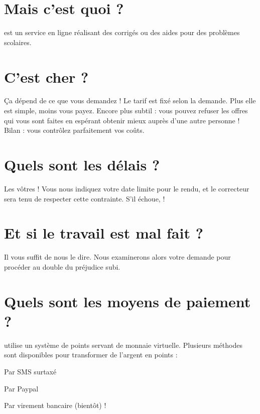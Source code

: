 \section{Mais c'est quoi \eDevoir ?}
\eDevoir est un service en ligne réalisant des corrigés ou des aides pour des problèmes scolaires.

\section{C'est cher ?}
Ça dépend de ce que vous demandez ! Le tarif est fixé selon la demande. Plus elle est simple, moins vous payez.
Encore plus subtil : vous pouvez refuser les offres qui vous sont faites en espérant obtenir mieux auprès d'une autre personne ! Bilan : vous contrôlez parfaitement vos coûts.

\section{Quels sont les délais ?}
Les vôtres ! Vous nous indiquez votre date limite pour le rendu, et le correcteur sera tenu de respecter cette contrainte. S'il échoue,  !

\section{Et si le travail est mal fait ?}
Il vous suffit de nous le dire. Nous examinerons alors votre demande pour procéder  au double du préjudice subi.

\section{Quels sont les moyens de paiement ?}
\eDevoir utilise un système de points servant de monnaie virtuelle.
Plusieurs méthodes sont disponibles pour transformer de l'argent en points :
\item Par SMS surtaxé
\item Par Paypal
\item Par virement bancaire (bientôt) !